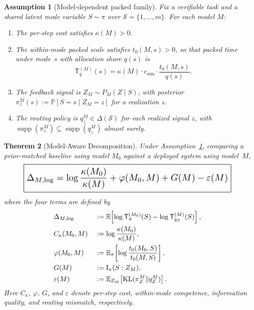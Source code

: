 \documentclass[10pt,twocolumn]{article}
\theoremstyle{paperplain}
\newtheorem{theorem}{Theorem}[section]
\theoremstyle{paperdefinition}
\newtheorem{assumption}[theorem]{Assumption}
\theoremstyle{paperremark}
\newcommand{\KL}{\mathrm{KL}}
\newcommand{\I}{\mathrm{I}}
\newcommand{\E}{\mathbb{E}}
\newcommand{\Prb}{\mathbb{P}}
\newcommand{\cS}{\mathcal{S}}
\newcommand{\DlogM}{\Delta_{M,\log}}
\begin{document}
\begin{assumption}[Model-dependent packed family]
\label{ass:model-packed-family}
Fix a verifiable task and a shared latent mode variable $S \sim \pi$ over $\cS=\{1,\ldots,m\}$.
For each model $M$:
\begin{enumerate}
\item The per-step cost satisfies $\kappa(M)>0$.
\item The within-mode packed scale satisfies $t_0(M,s)>0$, so that packed time
under mode~$s$ with allocation share $q(s)$ is
\[
\mathsf{T}_q^{(M)}(s) = \kappa(M) \cdot c_{\mathrm{sim}} \cdot \frac{t_0(M,s)}{q(s)}.
\]
\item The feedback signal is $Z_M \sim P_M(Z \mid S)$, with posterior $\pi_z^M(s) := \Prb[S = s \mid Z_M = z]$ for a realization $z$.
\item The routing policy is $q_z^M \in \Delta(\cS)$ for each realized signal
$z$, with
$\operatorname{supp}(\pi_z^M)\subseteq\operatorname{supp}(q_z^M)$ almost
surely.
\end{enumerate}
\end{assumption}

\begin{theorem}[Model-Aware Decomposition]
\label{thm:four-term}
Under Assumption~\ref{ass:model-packed-family}, comparing a prior-matched baseline using model $M_0$ against a deployed system using model~$M$,
\begin{equation}
\label{eq:four-term}
\resizebox{0.88\columnwidth}{!}{$\boxed{\displaystyle
\DlogM
=\log\frac{\kappa(M_0)}{\kappa(M)}
+\varphi(M_0,M)+G(M)-\varepsilon(M)}$}
\end{equation}
where the four terms are defined by
\begin{align}
\makebox[6.0em][l]{$\DlogM$}
&:=\E\!\left[
\log \mathsf{T}_\pi^{(M_0)}(S)
-\log \mathsf{T}_{q_Z}^{(M)}(S)
\right], \nonumber\\
\makebox[6.0em][l]{$C_\kappa(M_0,M)$}
&:=\log\frac{\kappa(M_0)}{\kappa(M)}, \label{eq:kappa-term} \\
\makebox[6.0em][l]{$\varphi(M_0,M)$}
&:=\E_\pi\!\left[\log\frac{t_0(M_0,S)}{t_0(M,S)}\right], \label{eq:phi-term} \\
\makebox[6.0em][l]{$G(M)$}
&:=\I_\pi(S : Z_M), \label{eq:G-term} \\
\makebox[6.0em][l]{$\varepsilon(M)$}
&:=\E_{Z_M}\!\left[\KL(\pi_Z^M \| q_Z^M)\right]. \label{eq:eps-term}
\end{align}
Here $C_\kappa$, $\varphi$, $G$, and $\varepsilon$ denote per-step cost,
within-mode competence, information quality, and routing mismatch, respectively.
\end{theorem}
\end{document}
